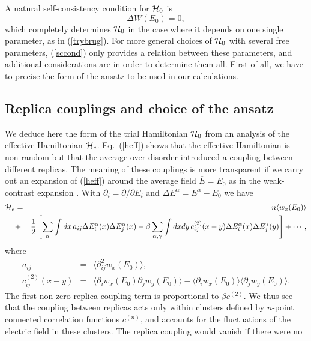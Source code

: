 A natural self-consistency condition for ${\cal H}_0$ 
is 
\begin{equation}
\label{sccond}
\Delta W(E_0)=0,
\end{equation}
which completely determines ${\cal H}_0$ in the case where it 
depends on one single parameter, as in (\ref{trybrug}). For more general 
choices of ${\cal H}_0$ with several free parameters, (\ref{sccond}) 
only provides a relation between these parameters, and additional 
considerations are in order to determine them all. First of all, 
we have to precise the form of the ansatz to be used in our calculations.

\subsection{Replica couplings and choice of the ansatz}
\label{rcacota}
We deduce here the form of the trial Hamiltonian ${\cal H}_0$ from an
analysis of the effective Hamiltonian ${\cal H}_e$. Eq.\ (\ref{heff})
shows that the effective Hamiltonian is non-random but that the
average over disorder introduced a coupling between different
replicas. The meaning of these couplings is more transparent if we
carry out an expansion of (\ref{heff}) around the average field
$\overline{E}=E_0$ as in the weak-contrast expansion \cite{BART98}.
With $\partial_i=\partial/\partial E_i$ and $\Delta
E^\alpha=E^\alpha-E_0$ we have
\begin{eqnarray}
{\cal H}_e&=&n\langle w_x(E_0)\rangle\nonumber\\
&+&\frac{1}{2}
\left[ \sum_{\alpha}\int dx\,a_{ij}\Delta E^\alpha_i(x)
\Delta E^\alpha_j(x)-\beta\sum_{\alpha,\gamma}
\int dx dy\, c^{(2)}_{ij}(x-y)\Delta E^\alpha_i(x)
\Delta E^\gamma_j(y)\right] +\cdots,
\end{eqnarray}
where
\begin{eqnarray}
\label{aa}
a_{ij}&=&\langle \partial^2_{ij} w_x(E_0)\rangle,\\
\label{bb}
c^{(2)}_{ij}(x-y)&=&\langle\partial_{i} w_x(E_0)\partial_{j} w_y(E_0)
\rangle-\langle \partial_{i} w_x(E_0)\rangle\langle\partial_{j} 
w_y(E_0)\rangle.
\end{eqnarray}
The first non-zero replica-coupling term is proportional to $\beta
c^{(2)}$. We thus see that the coupling between replicas acts only
within clusters defined by $n$-point connected correlation functions
$c^{(n)}$, and accounts for the fluctuations of the electric field in
these clusters. The replica coupling would vanish if there were no
